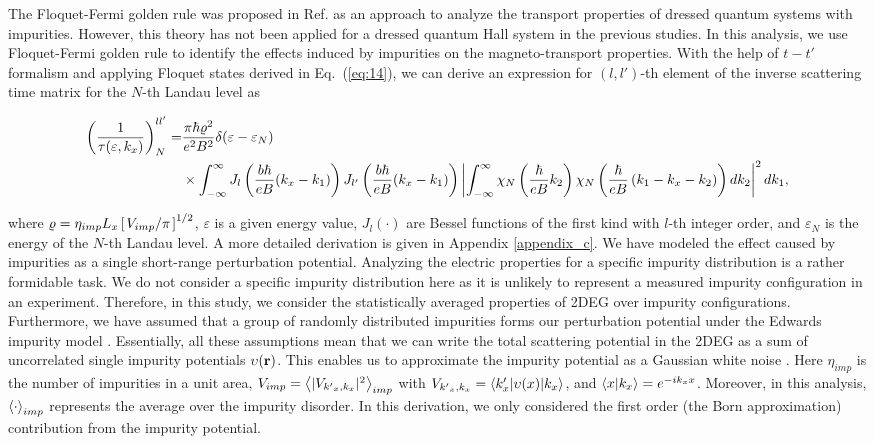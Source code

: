 \documentclass[
 reprint,
 amsmath,amssymb,
 aps,
 prb,
]{revtex4-2}
\begin{document}
The Floquet-Fermi golden rule was proposed in Ref. \cite{wackerl20} as an approach to analyze the transport properties of dressed quantum systems with impurities.
However, this theory has not been applied for a dressed quantum Hall system in the previous studies. In this analysis, we use Floquet-Fermi golden rule to identify the effects induced by impurities on the magneto-transport properties.
With the help of $t-t'$ formalism \cite{wackerl20,grifoni98,sambe75,peskin93,althorpe97} and applying Floquet states derived in Eq.~(\ref{eq:14}), we can derive an  expression for $(l,l')$-th element of the inverse scattering time matrix for the $N$-th Landau level as
\begin{widetext}
\begin{equation} \label{eq:15}
  \begin{aligned}
    \left(\frac{1}{\tau(\varepsilon,k_x)}\right)^{ll'}_N = &
    \frac{ \pi \hbar\varrho^2}{e^2B^2} \delta(\varepsilon - \varepsilon_N) \\
    & \times
    \int_{-\infty}^{\infty}
    J_l \bm{\left(} \frac{b\hbar}{eB}({k}_x - k_1) \bm{\right)}
    J_{l'} \bm{\left(} \frac{b\hbar}{eB}({k}_x - k_1) \bm{\right)}
    \left|
    \int_{-\infty}^{\infty}
    \chi_N \left( \frac{\hbar}{eB}k_2 \right)
    \chi_N \bm{\left(} \frac{\hbar}{eB}
    \left( k_1 - {k}_x - k_2 \right) \bm{\right)}
    dk_2 \right|^2 d k_1,
  \end{aligned}
\end{equation}
\end{widetext}
where $\varrho = \eta_{imp} L_x \left[\flatfrac{ V_{imp}}{\pi}\right]^{1/2}$, $\varepsilon$ is a given energy value, $J_l(\cdot)$ are Bessel functions of the first kind with $l$-th integer order, and $\varepsilon_N$ is the energy of the $N$-th Landau level.
A more detailed derivation is given in Appendix \ref{appendix_c}.
{\color{Red}
We have modeled the effect caused by impurities as a single short-range perturbation potential. Analyzing the electric properties for a specific impurity distribution is a rather formidable task. We do not consider a specific impurity distribution here as it is unlikely to represent a measured impurity configuration in an experiment.
Therefore, in this study, we consider the statistically averaged properties of 2DEG over impurity configurations.
Furthermore, we have assumed that a group of randomly distributed impurities forms our perturbation potential under the Edwards impurity model  \cite{akkermans10,wackerl20}.
Essentially, all these assumptions mean that we can write the total scattering potential in the 2DEG as a sum of uncorrelated single impurity potentials $\upsilon(\vb{r})$. This enables us to approximate the impurity potential as a Gaussian white noise \cite{akkermans10,wackerl20}.
Here $\eta_{imp}$ is the number of impurities in a unit area, $V_{imp} = \expval{|V_{{k'}_x,k_x}|^2}_{imp}$ with $V_{{k'}_x,k_x} = \mel**{k'_x}{\upsilon(x) }{k_x}$, and $\braket{x}{k_x} = e^{-ik_x x}$.
Moreover, in this analysis, $\expval{\cdot}_{imp}$ represents the average over the impurity disorder. In this derivation, we only considered the first order (the Born approximation) contribution from the impurity potential.
}
\end{document}
